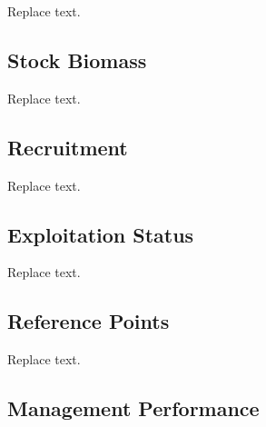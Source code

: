 \documentclass[11pt,
  english,
  a4paper,
]{article}
\begin{document}
\leavevmode\tagmcend\tagstructend

Replace text.


\hypertarget{stock-biomass}{%
\subsection*{Stock Biomass}\label{stock-biomass}}

\leavevmode\tagmcend\tagstructend

Replace text.


\hypertarget{recruitment}{%
\subsection*{Recruitment}\label{recruitment}}

\leavevmode\tagmcend\tagstructend

Replace text.


\hypertarget{exploitation-status}{%
\subsection*{Exploitation Status}\label{exploitation-status}}

\leavevmode\tagmcend\tagstructend

Replace text.


\hypertarget{reference-points}{%
\subsection*{Reference Points}\label{reference-points}}

\leavevmode\tagmcend\tagstructend

Replace text.


\hypertarget{management-performance}{%
\subsection*{Management Performance}\label{management-performance}}
\end{document}
